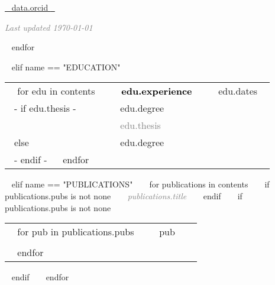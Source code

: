 \begin{minipage}{\textwidth}
    \begin{center} 
    \footnotesize 
    \href{~{{ data.orcidURL }}~}{\orcid \hspace{0.05cm} \footnotesize ~{{ data.orcid }}~ }  
    \end{center}

    \begin{center} \footnotesize \emph{\textcolor{gray}{Last updated \today }} \end{center}
    \vspace{0.7cm}

  ~{ endfor }~



~{ elif name == "EDUCATION" }~

  \begin{tabular}{ p{} 
                   p{} 
                   p{}}
  ~{ for edu in contents }~
  \small\textcolor{gray}{{\emph{  }}} & \textbf{\textcolor{black}{~{{ edu.experience }}~}} & {\hfill \small{~{{ edu.dates }}~}}\\
  ~{- if edu.thesis -}~ 
  \small & {~{{ edu.degree }}~} & {\hfill} \\
   & \small{\textcolor{gray}{~{{ edu.thesis }}~}} & {\hfill} \newline \\
  ~{else}~
   \small & {~{{ edu.degree }}~} & {\hfill} \newline\\
  ~{- endif -}~
  ~{ endfor }~
\end{tabular}


%

~{ elif name == "PUBLICATIONS" }~
~{ for publications in contents }~
  ~{ if publications.pubs is not none }~ 
  \textcolor{gray}{{\emph{~{{ publications.title }}~}}} 
  ~{ endif }~
  ~{ if publications.pubs is not none }~ 
    \begin{tabular}{ p{} %
                     p{} 
                     p{}} %
    ~{ for pub in publications.pubs }~
      \small\textcolor{gray}{{\emph{  }}} & {~{{ pub }}~} & {\hfill \small{ }} \\ \\
    ~{ endfor }~ 
    \end{tabular}
  ~{ endif }~
~{ endfor }~


\end{minipage}
